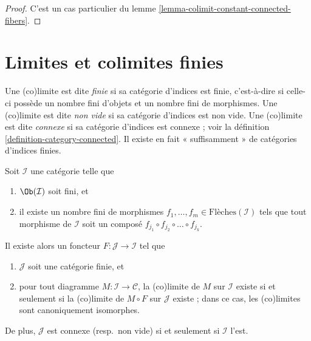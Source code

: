 \begin{proof}
C'est un cas particulier du
lemme \ref{lemma-colimit-constant-connected-fibers}.
\end{proof}





\section{Limites et colimites finies}
\label{section-finite-limits}

\noindent
Une (co)limite est dite {\it finie} si sa catégorie d'indices est finie,
c'est-à-dire si celle-ci possède un nombre fini d'objets et un nombre fini
de morphismes. Une (co)limite est dite {\it non vide} si sa catégorie
d'indices est non vide. Une (co)limite est dite {\it connexe} si sa catégorie
d'indices est connexe ; voir la
définition \ref{definition-category-connected}.
Il existe en fait « suffisamment » de catégories d'indices finies.

\begin{lemma}
\label{lemma-finite-diagram-category}
Soit $\mathcal{I}$ une catégorie telle que
\begin{enumerate}
\item $\Ob(\mathcal{I})$ soit fini, et
\item il existe un nombre fini de morphismes
$f_1, \ldots, f_m \in \text{Flèches}(\mathcal{I})$ tels
que tout morphisme de $\mathcal{I}$ soit un composé
$f_{j_1} \circ f_{j_2} \circ \ldots \circ f_{j_k}$.
\end{enumerate}
Il existe alors un foncteur $F : \mathcal{J} \to \mathcal{I}$ tel que
\begin{enumerate}
\item[(a)] $\mathcal{J}$ soit une catégorie finie, et
\item[(b)] pour tout diagramme $M : \mathcal{I} \to \mathcal{C}$, la
(co)limite de $M$ sur $\mathcal{I}$ existe si et seulement si
la (co)limite de $M \circ F$ sur $\mathcal{J}$ existe ; dans ce cas,
les (co)limites sont canoniquement isomorphes.
\end{enumerate}
De plus, $\mathcal{J}$ est connexe (resp.\ non vide) si et seulement si
$\mathcal{I}$ l'est.
\end{lemma}


